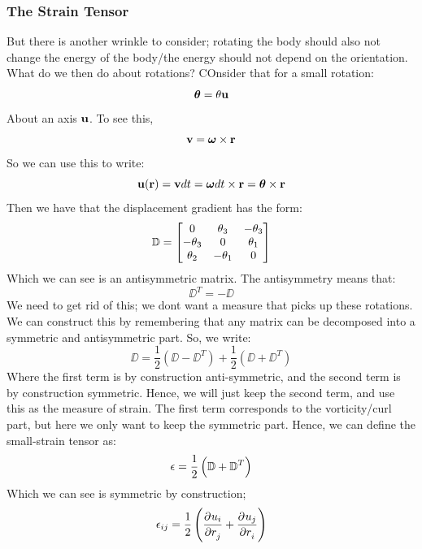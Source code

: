 \subsubsection{The Strain Tensor}
But there is another wrinkle to consider; rotating the body should also not change the energy of the body/the energy should not depend on the orientation. What do we then do about rotations?
COnsider that for a small rotation:
\[\bm{\theta} = \theta\mathbf{u}\]
About an axis $\mathbf{u}$. To see this, 
\[\mathbf{v} = \bm{\omega} \times \mathbf{r}\]
So we can use this to write:
\[\mathbf{u}(\mathbf{r}) = \mathbf{v}dt = \bm{\omega} dt \times \mathbf{r} = \bm{\theta} \times \mathbf{r}\]
Then we have that the displacement gradient has the form:
\[\mathbb{D} = \begin{bmatrix}0 & \theta_3 & -\theta_3 \\ -\theta_3 & 0 & \theta_1 \\ \theta_2 & -\theta_1 & 0\end{bmatrix}\]
Which we can see is an antisymmetric matrix. The antisymmetry means that:
\[\DD^T = -\DD\]
We need to get rid of this; we dont want a measure that picks up these rotations. We can construct this by remembering that any matrix can be decomposed into a symmetric and antisymmetric part. So, we write:
\[\DD = \frac{1}{2}(\DD - \DD^T) + \frac{1}{2}(\DD + \DD^T)\]
Where the first term is by construction anti-symmetric, and the second term is by construction symmetric. Hence, we will just keep the second term, and use this as the measure of strain. The first term corresponds to the vorticity/curl part, but here we only want to keep the symmetric part. Hence, we can define the small-strain tensor as:
\[\epsilon = \frac{1}{2}\left(\mathbb{D} + \mathbb{D}^T\right)\]
Which we can see is symmetric by construction;
\[\e_{ij} = \frac{1}{2}\left(\dpd{u_i}{r_j} + \dpd{u_j}{r_i}\right)\]

